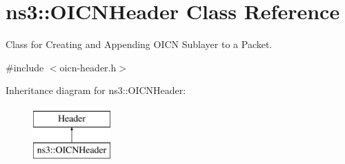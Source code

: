 \hypertarget{classns3_1_1OICNHeader}{\section{ns3\-:\-:O\-I\-C\-N\-Header Class Reference}
\label{classns3_1_1OICNHeader}
}


Class for Creating and Appending O\-I\-C\-N Sublayer to a Packet.  




{\ttfamily \#include $<$oicn-\/header.\-h$>$}

Inheritance diagram for ns3\-:\-:O\-I\-C\-N\-Header\-:\begin{figure}[H]
\begin{center}
\leavevmode
\includegraphics[height=2.000000cm]{classns3_1_1OICNHeader}
\end{center}
\end{figure}
